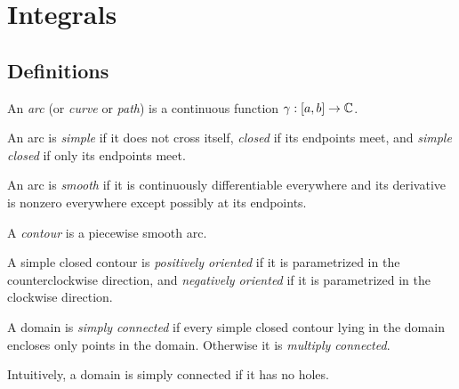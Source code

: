 %
%
%
\section{Integrals}
\subsection*{Definitions}
\begin{defn}
An \emph{arc} (or \emph{curve} or \emph{path}) is a continuous function \(\gamma:[a,b]\to\mathbb{C}\).
\end{defn}
\begin{defn}
An arc is \emph{simple} if it does not cross itself, \emph{closed} if its endpoints meet, and \emph{simple closed} if only its endpoints meet.
\end{defn}
\begin{defn}
An arc is \emph{smooth} if it is continuously differentiable everywhere and its derivative is nonzero everywhere except possibly at its endpoints.
\end{defn}
\begin{defn}
A \emph{contour} is a piecewise smooth arc.
\end{defn}
\begin{defn}
A simple closed contour is \emph{positively oriented} if it is parametrized in the counterclockwise direction, and \emph{negatively oriented} if it is parametrized in the clockwise direction.
\end{defn}
\begin{defn}
A domain is \emph{simply connected} if every simple closed contour lying in the domain encloses only points in the domain. Otherwise it is \emph{multiply connected}.
\end{defn}
\begin{rmk}
Intuitively, a domain is simply connected if it has no holes.
\end{rmk}

